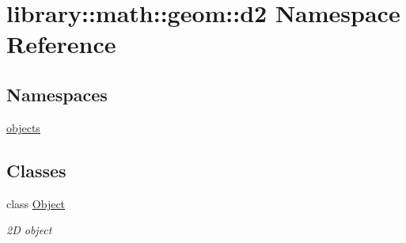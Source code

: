 \hypertarget{namespacelibrary_1_1math_1_1geom_1_1d2}{}\section{library\+:\+:math\+:\+:geom\+:\+:d2 Namespace Reference}
\label{namespacelibrary_1_1math_1_1geom_1_1d2}
\subsection*{Namespaces}
\begin{DoxyCompactItemize}
\item 
 \hyperlink{namespacelibrary_1_1math_1_1geom_1_1d2_1_1objects}{objects}
\end{DoxyCompactItemize}
\subsection*{Classes}
\begin{DoxyCompactItemize}
\item 
class \hyperlink{classlibrary_1_1math_1_1geom_1_1d2_1_1_object}{Object}
\begin{DoxyCompactList}\small\item\em 2D object \end{DoxyCompactList}\end{DoxyCompactItemize}
